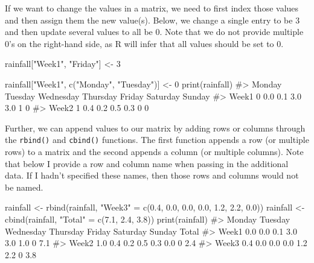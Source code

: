 \documentclass[
  letterpaper,
]{krantz}
\makeatletter
\newenvironment{Shaded}{\begin{snugshade}}{\end{snugshade}}
\newcommand{\CommentTok}[1]{\textcolor[rgb]{0.37,0.37,0.37}{#1}}
\newcommand{\DecValTok}[1]{\textcolor[rgb]{0.68,0.00,0.00}{#1}}
\newcommand{\FloatTok}[1]{\textcolor[rgb]{0.68,0.00,0.00}{#1}}
\newcommand{\FunctionTok}[1]{\textcolor[rgb]{0.28,0.35,0.67}{#1}}
\newcommand{\NormalTok}[1]{\textcolor[rgb]{0.00,0.23,0.31}{#1}}
\newcommand{\OtherTok}[1]{\textcolor[rgb]{0.00,0.23,0.31}{#1}}
\newcommand{\StringTok}[1]{\textcolor[rgb]{0.13,0.47,0.30}{#1}}
\newenvironment{kframe}{%
\medskip{}
\setlength{\fboxsep}{.8em}
 \def\at@end@of@kframe{}%
 \ifinner\ifhmode%
  \def\at@end@of@kframe{\end{minipage}}%
  \begin{minipage}{\columnwidth}%
 \fi\fi%
 \def\FrameCommand##1{\hskip\@totalleftmargin \hskip-\fboxsep
 \colorbox{shadecolor}{##1}\hskip-\fboxsep
     \hskip-\linewidth \hskip-\@totalleftmargin \hskip\columnwidth}%
 \MakeFramed {\advance\hsize-\width
   \@totalleftmargin\z@ \linewidth\hsize
   \@setminipage}}%
 {\par\unskip\endMakeFramed%
 \at@end@of@kframe}
\renewenvironment{Shaded}{\begin{kframe}}{\end{kframe}}
\makeatother
\begin{document}
If we want to change the values in a matrix, we need to first index
those values and then assign them the new value(s). Below, we change a
single entry to be 3 and then update several values to all be 0. Note
that we do not provide multiple 0's on the right-hand side, as R will
infer that all values should be set to 0.

\begin{Shaded}
\begin{Highlighting}[]
\NormalTok{rainfall[}\StringTok{"Week1"}\NormalTok{, }\StringTok{"Friday"}\NormalTok{] }\OtherTok{\textless{}{-}} \DecValTok{3}
\end{Highlighting}
\end{Shaded}

\begin{Shaded}
\begin{Highlighting}[]
\NormalTok{rainfall[}\StringTok{"Week1"}\NormalTok{, }\FunctionTok{c}\NormalTok{(}\StringTok{"Monday"}\NormalTok{, }\StringTok{"Tuesday"}\NormalTok{)] }\OtherTok{\textless{}{-}} \DecValTok{0}
\FunctionTok{print}\NormalTok{(rainfall)}
\CommentTok{\#\textgreater{}       Monday Tuesday Wednesday Thursday Friday Saturday Sunday}
\CommentTok{\#\textgreater{} Week1      0     0.0       0.1      3.0    3.0        1      0}
\CommentTok{\#\textgreater{} Week2      1     0.4       0.2      0.5    0.3        0      0}
\end{Highlighting}
\end{Shaded}

Further, we can append values to our matrix by adding rows or columns
through the \texttt{rbind()} and \texttt{cbind()} functions. The first
function appends a row (or multiple rows) to a matrix and the second
appends a column (or multiple columns). Note that below I provide a row
and column name when passing in the additional data. If I hadn't
specified these names, then those rows and columns would not be named.

\begin{Shaded}
\begin{Highlighting}[]
\NormalTok{rainfall }\OtherTok{\textless{}{-}} \FunctionTok{rbind}\NormalTok{(rainfall, }\StringTok{"Week3"} \OtherTok{=} \FunctionTok{c}\NormalTok{(}\FloatTok{0.4}\NormalTok{, }\FloatTok{0.0}\NormalTok{, }\FloatTok{0.0}\NormalTok{, }\FloatTok{0.0}\NormalTok{, }\FloatTok{1.2}\NormalTok{, }\FloatTok{2.2}\NormalTok{, }
                                        \FloatTok{0.0}\NormalTok{))}
\NormalTok{rainfall }\OtherTok{\textless{}{-}} \FunctionTok{cbind}\NormalTok{(rainfall, }\StringTok{"Total"} \OtherTok{=} \FunctionTok{c}\NormalTok{(}\FloatTok{7.1}\NormalTok{, }\FloatTok{2.4}\NormalTok{, }\FloatTok{3.8}\NormalTok{))}
\FunctionTok{print}\NormalTok{(rainfall)}
\CommentTok{\#\textgreater{}       Monday Tuesday Wednesday Thursday Friday Saturday Sunday Total}
\CommentTok{\#\textgreater{} Week1    0.0     0.0       0.1      3.0    3.0      1.0      0   7.1}
\CommentTok{\#\textgreater{} Week2    1.0     0.4       0.2      0.5    0.3      0.0      0   2.4}
\CommentTok{\#\textgreater{} Week3    0.4     0.0       0.0      0.0    1.2      2.2      0   3.8}
\end{Highlighting}
\end{Shaded}
\end{document}
